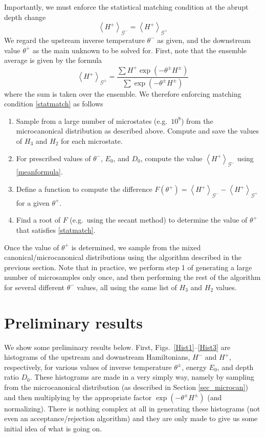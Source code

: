 \documentclass[12pt]{article}
\newcommand{\mean}[1]{\left< #1 \right>}
\newcommand{\Gibbs}{\mathcal{G}}
\begin{document}
Importantly, we must enforce the statistical matching condition at the abrupt depth change
\begin{equation}
\label{statmatch}
\mean{H^+}_{\Gibbs^-} = \mean{H^+}_{\Gibbs^+}
\end{equation}
We regard the upstream inverse temperature $\theta^-$ as given, and the downstream value $\theta^+$ as the main unknown to be solved for.
First, note that the ensemble average is given by the formula
\begin{equation}
\label{meanformula}
\mean{H^+}_{\Gibbs^{\pm}} = \frac{ \sum H^+ \exp(- \theta^{\pm} H^{\pm}) } {\sum \exp(-\theta^{\pm} H^{\pm}) }
\end{equation}
where the sum is taken over the ensemble. We therefore enforcing matching condition \eqref{statmatch} as follows

\begin{enumerate}
\item Sample from a large number of microstates (e.g.~$10^8$) from the microcanonical distribution as described above. Compute and save the values of $H_3$ and $H_2$ for each microstate.
\item For prescribed values of $\theta^-$, $E_0$, and $D_0$, compute the value $\mean{H^+}_{\Gibbs^-}$ using \eqref{meanformula}.
\item Define a function to compute the difference $F(\theta^+) = \mean{H^+}_{\Gibbs^-} - \mean{H^+}_{\Gibbs^+}$ for a given $\theta^+$.
\item Find a root of $F$ (e.g.~using the secant method) to determine the value of $\theta^+$ that satisfies \eqref{statmatch}.
\end{enumerate}
Once the value of $\theta^+$ is determined, we sample from the mixed canonical/microcanonical distributions using the algorithm described in the previous section. Note that in practice, we perform step 1 of generating a large number of microsamples only once, and then performing the rest of the algorithm for several different $\theta^-$ values, all using the same list of $H_3$ and $H_2$ values.


\section{Preliminary results}

We show some preliminary results below. First, Figs.~\ref{Hist1}--\ref{Hist3} are histograms of the upstream and downstream Hamiltonians, $H^-$ and $H^+$, respectively, for various values of inverse temperature $\theta^{\pm}$, energy $E_0$, and depth ratio $D_0$. These histograms are made in a very simply way, namely by sampling from the microcanonical distribution (as described in Section \ref{sec_microcan}) and then multiplying by the appropriate factor $\exp(-\theta^{\pm} H^{\pm})$ (and normalizing). There is nothing complex at all in generating these histograms (not even an acceptance/rejection algorithm) and they are only made to give us some initial idea of what is going on.
\end{document}
